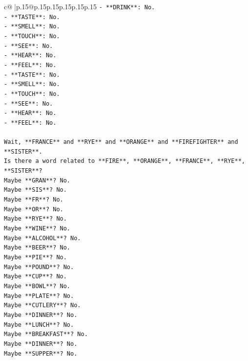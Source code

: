 \documentclass{article}
\begin{document}
{\begin{supertabular}{c@{$\;$}|p{.15\linewidth}@{}p{.15\linewidth}p{.15\linewidth}p{.15\linewidth}p{.15\linewidth}p{.15\linewidth}}
{{{\texttt{{-} **DRINK**: No.} \\
\texttt{{-} **TASTE**: No.} \\
\texttt{{-} **SMELL**: No.} \\
\texttt{{-} **TOUCH**: No.} \\
\texttt{{-} **SEE**: No.} \\
\texttt{{-} **HEAR**: No.} \\
\texttt{{-} **FEEL**: No.} \\
\texttt{{-} **TASTE**: No.} \\
\texttt{{-} **SMELL**: No.} \\
\texttt{{-} **TOUCH**: No.} \\
\texttt{{-} **SEE**: No.} \\
\texttt{{-} **HEAR**: No.} \\
\texttt{{-} **FEEL**: No.} \\
\\ 
\texttt{Wait, **FRANCE** and **RYE** and **ORANGE** and **FIREFIGHTER** and **SISTER**.} \\
\texttt{Is there a word related to **FIRE**, **ORANGE**, **FRANCE**, **RYE**, **SISTER**?} \\
\texttt{Maybe **GRAN**? No.} \\
\texttt{Maybe **SIS**? No.} \\
\texttt{Maybe **FR**? No.} \\
\texttt{Maybe **OR**? No.} \\
\texttt{Maybe **RYE**? No.} \\
\texttt{Maybe **WINE**? No.} \\
\texttt{Maybe **ALCOHOL**? No.} \\
\texttt{Maybe **BEER**? No.} \\
\texttt{Maybe **PIE**? No.} \\
\texttt{Maybe **POUND**? No.} \\
\texttt{Maybe **CUP**? No.} \\
\texttt{Maybe **BOWL**? No.} \\
\texttt{Maybe **PLATE**? No.} \\
\texttt{Maybe **CUTLERY**? No.} \\
\texttt{Maybe **DINNER**? No.} \\
\texttt{Maybe **LUNCH**? No.} \\
\texttt{Maybe **BREAKFAST**? No.} \\
\texttt{Maybe **DINNER**? No.} \\
\texttt{Maybe **SUPPER**? No.} \\
}}}
\end{supertabular}}
\end{document}
